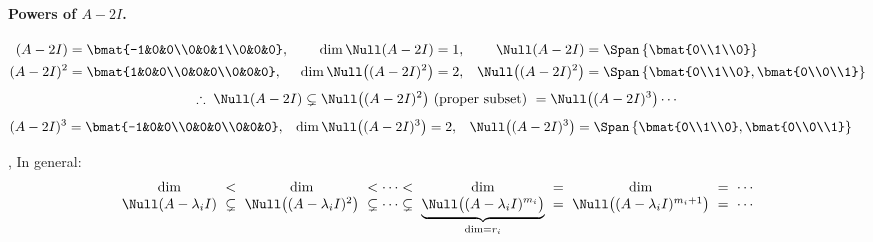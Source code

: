\begin{example}
\paragraph{Powers of $A-2I$.}
\begin{align*}
(A-2I)&=\bmat{-1&0&0\\0&0&1\\0&0&0}, & \dim\Null(A-2I)&=1, & \Null(A-2I)&=\Span\left\{\bmat{0\\1\\0}\right\}\\
(A-2I)^2&=\bmat{1&0&0\\0&0&0\\0&0&0}, & \dim\Null\big((A-2I)^2\big)&=2, & \Null\big((A-2I)^2\big)&=\Span\left\{\bmat{0\\1\\0},\bmat{0\\0\\1}\right\}
\end{align*}
\[
\therefore\;\Null(A-2I)\subsetneq\Null\big((A-2I)^2\big)\ \text{(proper subset)}\ =\Null\big((A-2I)^3\big)\cdots
\]
\begin{align*}
(A-2I)^3&=\bmat{-1&0&0\\0&0&0\\0&0&0}, & \dim\Null\big((A-2I)^3\big)&=2, & \Null\big((A-2I)^3\big)&=\Span\left\{\bmat{0\\1\\0},\bmat{0\\0\\1}\right\}
\end{align*}

\sep
In general:
\[\setlength{\arraycolsep}{3pt}
\begin{array}{ccccccccc}
\dim & < & \dim & < \cdots < & \dim & = & \dim & = & \cdots\\
\Null(A-\lambda_iI) & \subsetneq & \Null\big((A-\lambda_iI)^2\big) & \subsetneq\cdots\subsetneq & \underbrace{\Null\big((A-\lambda_iI)^{m_i}\big)}_{\dim=r_i} & = & \Null\big((A-\lambda_iI)^{m_i+1}\big) & = & \cdots
\end{array}
\]
\end{example}

